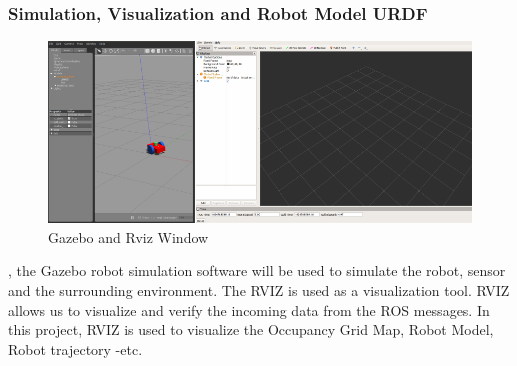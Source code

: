 














\subsubsection{Simulation, Visualization and Robot Model URDF}
\begin{figure}[ht]
	\centering
	\includegraphics[scale=1]{images/imagess/6pp-rvgz.pdf}
	\caption{Gazebo and Rviz Window}
	\label{fig:Gazebo and Rviz Window}
\end{figure}
\hspace{1.27cm}
\textbf{\figureautorefname{ \ref{fig:Gazebo and Rviz Window}}}, the Gazebo robot simulation software will be used to simulate the robot, sensor and the surrounding environment. The RVIZ is used as a visualization tool. RVIZ allows us to visualize and verify the incoming data from the ROS messages. In this project, RVIZ is used to visualize the Occupancy Grid Map, Robot Model, Robot trajectory -etc.\par












